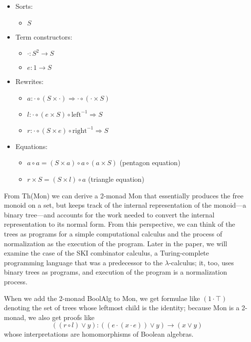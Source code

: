 \documentclass{llncs}
\newcommand{\maps}{\colon}
\newcommand{\leftu}{\mathrm{left}}
\newcommand{\rightu}{\mathrm{right}}
\begin{document}
\begin{center}
  \begin{itemize}
    \item Sorts:
    \begin{itemize}
      \item $S$
    \end{itemize}
    \item Term constructors:
    \begin{itemize}
      \item $\cdot\maps S^2 \to S$
      \item $e\maps 1 \to S$
    \end{itemize}
    \item Rewrites:
    \begin{itemize}
      \item $a\maps \cdot \circ (S \times \cdot) \Rightarrow \cdot \circ (\cdot \times S)$
      \item $l\maps \cdot \circ (e \times S) \circ \leftu^{-1} \Rightarrow S$
      \item $r\maps \cdot \circ (S \times e) \circ \rightu^{-1} \Rightarrow S$
    \end{itemize}
    \item Equations:
    \begin{itemize}
      \item $a \circ a = (S \times a) \circ a \circ (a \times S)$ (pentagon equation)
      \item $r \times S = (S \times l) \circ a$ (triangle equation)
    \end{itemize}
  \end{itemize}
\end{center}
From Th(Mon) we can derive a 2-monad Mon that essentially produces the free monoid on a set, but keeps track of the internal representation of the monoid---a binary tree---and accounts for the work needed to convert the internal representation to its normal form.  From this perspective, we can think of the trees as programs for a simple computational calculus and the process of normalization as the execution of the program.  Later in the paper, we will examine the case of the SKI combinator calculus, a Turing-complete programming language that was a predecessor to the $\lambda$-calculus; it, too, uses binary trees as programs, and execution of the program is a normalization process.

When we add the 2-monad BoolAlg to Mon, we get formulae like $(1 \cdot \top)$ denoting the set of trees whose leftmost child is the identity; because Mon is a 2-monad, we also get proofs like 
\[ ((r \circ l) \lor y)\maps ((e \cdot (x \cdot e)) \lor y) \to (x \lor y) \]
whose interpretations are homomorphisms of Boolean algebras.
\end{document}

